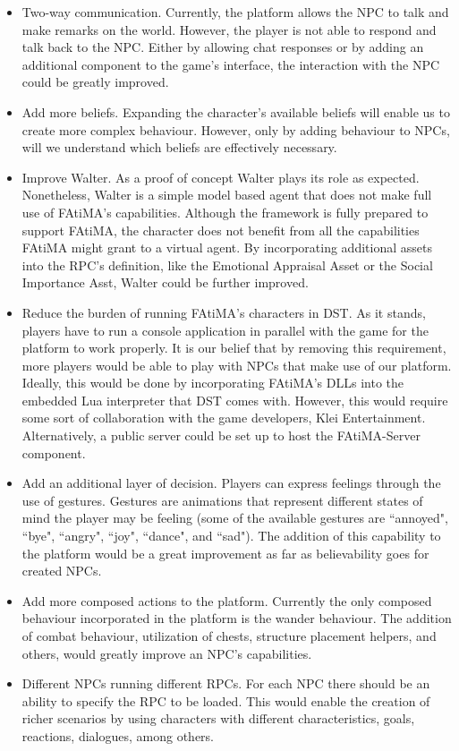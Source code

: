 \begin{itemize}
\item Two-way communication.
Currently, the platform allows the \ac{NPC} to talk and make remarks on the world.
However, the player is not able to respond and talk back to the \ac{NPC}.
Either by allowing chat responses or by adding an additional component to the game's interface, the interaction with the \ac{NPC} could be greatly improved.

\item Add more beliefs.
Expanding the character's available beliefs will enable us to create more complex behaviour.
However, only by adding behaviour to \acp{NPC}, will we understand which beliefs are effectively necessary.

\item Improve Walter.
As a proof of concept Walter plays its role as expected.
Nonetheless, Walter is a simple model based agent that does not make full use of \ac{FAtiMA}'s capabilities.
Although the framework is fully prepared to support \ac{FAtiMA}, the character does not benefit from all the capabilities \ac{FAtiMA} might grant to a virtual agent. By incorporating additional assets into the \ac{RPC}'s definition, like the Emotional Appraisal Asset or the Social Importance Asst, Walter could be further improved.

\item Reduce the burden of running FAtiMA's characters in \ac{DST}.
As it stands, players have to run a console application in parallel with the game for the platform to work properly.
It is our belief that by removing this requirement, more players would be able to play with \acp{NPC} that make use of our platform.
Ideally, this would be done by incorporating \ac{FAtiMA}'s \ac{DLL}s into the embedded Lua interpreter that \ac{DST} comes with.
However, this would require some sort of collaboration with the game developers, Klei Entertainment.
Alternatively, a public server could be set up to host the FAtiMA-Server component.

\item Add an additional layer of decision.
Players can express feelings through the use of gestures.
Gestures are animations that represent different states of mind the player may be feeling (some of the available gestures are ``annoyed", ``bye", ``angry", ``joy", ``dance", and ``sad").
The addition of this capability to the platform would be a great improvement as far as believability goes for created \acp{NPC}.

\item Add more composed actions to the platform.
Currently the only composed behaviour incorporated in the platform is the wander behaviour.
The addition of combat behaviour, utilization of chests, structure placement helpers, and others, would greatly improve an \ac{NPC}'s capabilities.

\item Different \acp{NPC} running different \acp{RPC}.
For each \ac{NPC} there should be an ability to specify the \ac{RPC} to be loaded.
This would enable the creation of richer scenarios by using characters with different characteristics, goals, reactions, dialogues, among others.

\end{itemize}
